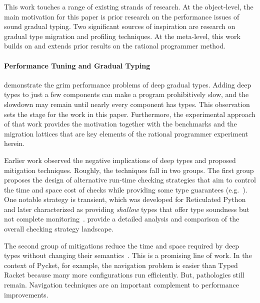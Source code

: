 

This work touches a range of existing strands of research. At
the object-level, the main motivation for this paper is prior research on
the performance issues of sound gradual typing.
Two significant
sources of inspiration are research on gradual type migration and
profiling techniques.  At the meta-level, this work builds on and extends
prior results on the rational programmer method.

\paragraph{Performance Tuning and Gradual Typing} 

\citet{gtnffvf-jfp-2019} demonstrate the grim performance problems of deep
gradual types.
Adding deep types to just a few components can make a program prohibitively
slow, and the slowdown may remain until nearly every component has types.
This observation sets the stage for the work in this paper.
Furthermore, the experimental approach of that work provides the
motivation together with the benchmarks and the migration lattices that
are key elements of the rational programmer experiment herein.

Earlier work observed the negative implications of deep types
and proposed mitigation techniques.
Roughly, the techniques fall in two groups. The first
group proposes the design of alternative run-time checking strategies that
aim to control the time and space cost of checks while providing
some type guarantees (e.g.~\citep{sgt-esop-2009,rmhn-ecoop-2019,glfd-pj-2022,lgmvpk-pj-2023,g-popl-2015,svctg-esop-2015,rat-oopsla-2017,sfrbcsb-popl-2014,rsfbv-popl-2015,coersion-passing-style}).
One notable strategy is transient, which was developed for Reticulated
Python~\cite{vksb-dls-2014,vss-popl-2017,vsc-dls-2019,v-thesis-2019}
and later characterized as providing \emph{shallow} types that offer
type soundness but not complete monitoring~\cite{gfd-oopsla-2019}.
\citet{type-untyped} provide a detailed analysis and comparison of the
overall checking strategy landscape.

The second group of mitigations reduce the time and space required
by deep types without changing their
semantics~\cite{htf-hosc-2010,stw-jfp-2021,stw-pldi-2015,collapsible,corpse-reviver,
kas-pldi-2019, rat-oopsla-2017,pycket,bbst-oopsla-2017}.
This is a promising line of work.
In the context of Pycket, for example, the navigation problem is easier
than Typed Racket because many more configurations run efficiently.
But, pathologies still remain.
Navigation techniques are an important complement to performance improvements.

